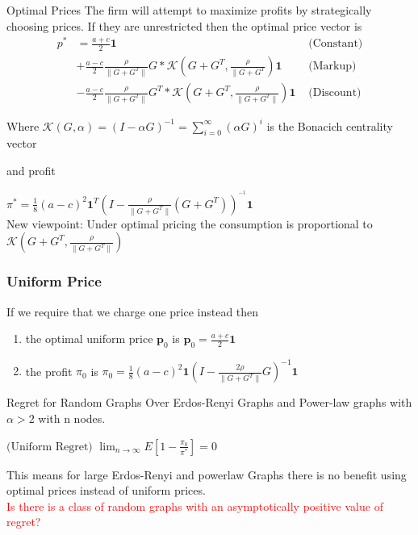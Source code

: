 \documentclass[11pt]{beamer}
\newcommand\<{\langle}
\renewcommand\>{\rangle}
\newcommand\inv{^{-1}}
\renewcommand{\v}[1]{\textbf{#1}}
\begin{document}
\begin{frame}{Optimal Prices}
  The firm will attempt to maximize profits by strategically choosing prices.
  If they are unrestricted then the optimal price vector is
  \begin{align*}
    p^{*} &= \frac{a+c}{2}\v{1} &\text{ (Constant)} \\
    &+  \frac{a-c}{2}\frac{\rho}{\|G+G^{T}\|}G * \mathcal{K}(G+G^{T}, \frac{\rho}{\|G+G^{T}}) \v{1} & \text{ (Markup)}\\
    &-  \frac{a-c}{2}\frac{\rho}{\|G+G^{T}\|}G^{T} * \mathcal{K}(G+G^{T}, \frac{\rho}{\|G+G^{T}\|}) \v{1} &\text{ (Discount)}
  \end{align*} \cite{candogan2012optimal}

  Where $\mathcal{K}(G, \alpha) = \left( I - \alpha G \right)\inv = \sum_{i=0}^{\infty} (\alpha G)^{i}$ is the Bonacich centrality vector

  and profit

  $\pi^{*} = \frac{1}{8}{(a-c)^{2}} \v{1}^{T} (I - \frac{\rho}{\|G+G^{T}\|} (G+G^{T}))^{\inv} \v{1}$\cite{huang2022value}
  \pause
  \\New viewpoint: Under optimal pricing  the consumption is proportional to $\mathcal{K}(G+G^{T}, \frac{\rho}{\|G+G^{T}\|})$
\end{frame}

\begin{frame}
  \frametitle{Uniform Price}

  If we require that we charge one price instead then
  \begin{enumerate}
    \item the optimal uniform price $\v{p}_{0}$ is
  $\v{p}_{0} = \frac{a+c}{2} \v{1}$\\

   \item the profit $\pi_{0}$ is
  $\pi_{0} = \frac{1}{8}(a-c)^{2} \v{1} (I - \frac{2\rho}{\|G+G^{T}\|}G)\inv \v{1}$
  \end{enumerate}
\end{frame}

\begin{frame}{Regret for Random Graphs}
  Over Erdos-Renyi Graphs and Power-law graphs with $\alpha > 2$ with n nodes. \\

  \begin{theorem}
  $\text{(Uniform Regret) } \lim_{n \to \infty} E[ 1 - \frac{\pi_{0}}{\pi^{*}}] = 0$
  \end{theorem}
  \cite{huang2022value}
  \pause
  This means for large Erdos-Renyi and powerlaw Graphs there is no benefit using optimal prices instead of uniform prices.\\
  \textcolor{red}{Is there is a class of random graphs with an asymptotically positive value of regret? }

\end{frame}
\end{document}

